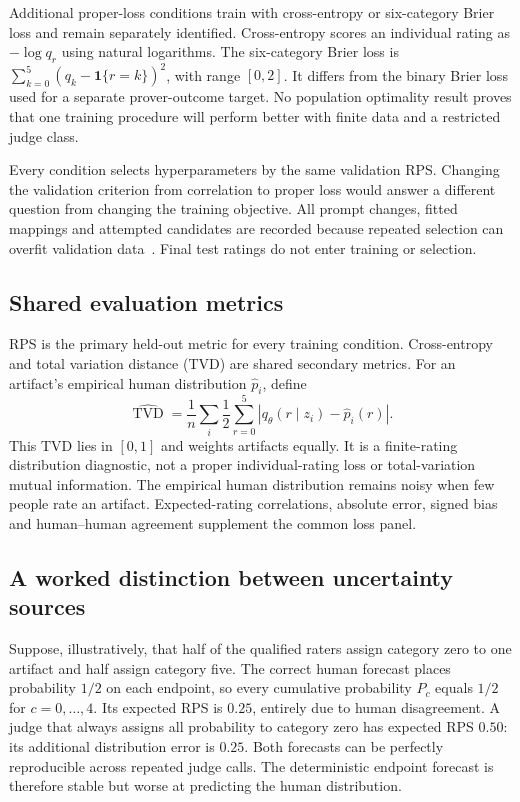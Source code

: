 Additional proper-loss conditions train with cross-entropy or six-category Brier loss and remain separately identified.
Cross-entropy scores an individual rating as $-\log q_r$ using natural logarithms.
The six-category Brier loss is $\sum_{k=0}^{5}(q_k-\mathbf1\{r=k\})^2$, with range $[0,2]$.
It differs from the binary Brier loss used for a separate prover-outcome target.
No population optimality result proves that one training procedure will perform better with finite data and a restricted judge class.

Every condition selects hyperparameters by the same validation RPS.
Changing the validation criterion from correlation to proper loss would answer a different question from changing the training objective.
All prompt changes, fitted mappings and attempted candidates are recorded because repeated selection can overfit validation data~\citep{cawley2010overfitting}.
Final test ratings do not enter training or selection.

\subsection{Shared evaluation metrics}
RPS is the primary held-out metric for every training condition.
Cross-entropy and total variation distance (TVD) are shared secondary metrics.
For an artifact's empirical human distribution $\widehat p_i$, define
\begin{equation}
 \widehat{\operatorname{TVD}}=\frac1n\sum_i\frac12
       \sum_{r=0}^{5}|q_\theta(r\mid z_i)-\widehat p_i(r)|.
\end{equation}
This TVD lies in $[0,1]$ and weights artifacts equally.
It is a finite-rating distribution diagnostic, not a proper individual-rating loss or total-variation mutual information.
The empirical human distribution remains noisy when few people rate an artifact.
Expected-rating correlations, absolute error, signed bias and human--human agreement supplement the common loss panel.

\subsection{A worked distinction between uncertainty sources}
Suppose, illustratively, that half of the qualified raters assign category zero to one artifact and half assign category five.
The correct human forecast places probability $1/2$ on each endpoint, so every cumulative probability $P_c$ equals $1/2$ for $c=0,\ldots,4$.
Its expected RPS is $0.25$, entirely due to human disagreement.
A judge that always assigns all probability to category zero has expected RPS $0.50$: its additional distribution error is $0.25$.
Both forecasts can be perfectly reproducible across repeated judge calls.
The deterministic endpoint forecast is therefore stable but worse at predicting the human distribution.


